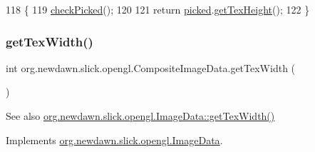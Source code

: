 \begin{DoxyCode}
118                               \{
119         \mbox{\hyperlink{classorg_1_1newdawn_1_1slick_1_1opengl_1_1_composite_image_data_a1a95487f3cd09ae6bf1458ffa1d433b8}{checkPicked}}();
120         
121         \textcolor{keywordflow}{return} \mbox{\hyperlink{classorg_1_1newdawn_1_1slick_1_1opengl_1_1_composite_image_data_a7238cbb20cc08b68a29935b4bc222da7}{picked}}.\mbox{\hyperlink{interfaceorg_1_1newdawn_1_1slick_1_1opengl_1_1_image_data_a316891c94ba43967d0554378c7197324}{getTexHeight}}();
122     \}
\end{DoxyCode}
\mbox{\label{classorg_1_1newdawn_1_1slick_1_1opengl_1_1_composite_image_data_aa669973b504de478c91db03a0319b389}} 
\subsubsection{\texorpdfstring{get\+Tex\+Width()}{getTexWidth()}}
{\footnotesize\ttfamily int org.\+newdawn.\+slick.\+opengl.\+Composite\+Image\+Data.\+get\+Tex\+Width (\begin{DoxyParamCaption}{ }\end{DoxyParamCaption})\hspace{0.3cm}{\ttfamily [inline]}}

\begin{DoxySeeAlso}{See also}
\mbox{\hyperlink{interfaceorg_1_1newdawn_1_1slick_1_1opengl_1_1_image_data_abf26e8dcbf2ec52f9a49535d8912263e}{org.\+newdawn.\+slick.\+opengl.\+Image\+Data\+::get\+Tex\+Width()}} 
\end{DoxySeeAlso}


Implements \mbox{\hyperlink{interfaceorg_1_1newdawn_1_1slick_1_1opengl_1_1_image_data_abf26e8dcbf2ec52f9a49535d8912263e}{org.\+newdawn.\+slick.\+opengl.\+Image\+Data}}.


